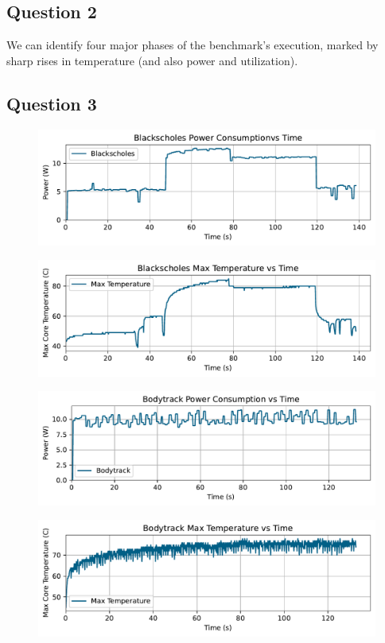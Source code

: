 \documentclass{article}
\begin{document}
\subsection{Question 2}
We can identify four major phases of the benchmark's execution, marked by sharp rises in temperature (and also power and utilization).

\subsection{Question 3}

\begin{figure} [!htb]
    \centering
    \includegraphics[scale=0.8]{blk_power.pdf}
    \label{fig:blk-power}
\end{figure}
\begin{figure} [!htb]
    \centering
    \includegraphics[scale=0.8]{blk_maxtemp.pdf}
    \label{fig:blk-maxtemp}
\end{figure}
\begin{figure} [!htb]
    \centering
    \includegraphics[scale=0.8]{body_power.pdf}
    \label{fig:body-power}
\end{figure}
\begin{figure} [!htb]
    \centering
    \includegraphics[scale=0.8]{body_maxtemp.pdf}
    \label{fig:body-maxtemp}
\end{figure}
\end{document}
